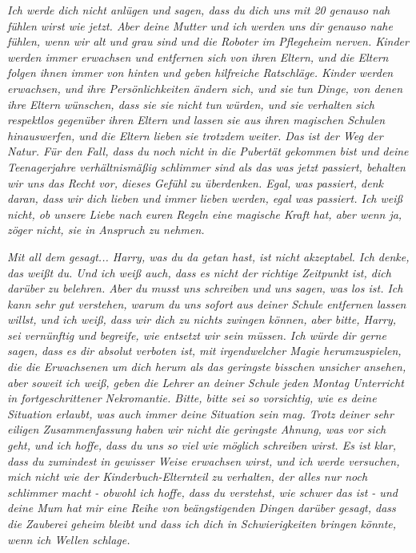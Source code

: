 {\emph{Ich werde dich nicht anlügen und sagen, dass du dich uns mit 20 genauso nah fühlen wirst wie jetzt. Aber deine Mutter und ich werden uns dir genauso nahe fühlen, wenn wir alt und grau sind und die Roboter im Pflegeheim nerven. Kinder werden immer erwachsen und entfernen sich von ihren Eltern, und die Eltern folgen ihnen immer von hinten und geben hilfreiche Ratschläge. Kinder werden erwachsen, und ihre Persönlichkeiten ändern sich, und sie tun Dinge, von denen ihre Eltern wünschen, dass sie sie nicht tun würden, und sie verhalten sich respektlos gegenüber ihren Eltern und lassen sie aus ihren magischen Schulen hinauswerfen, und die Eltern lieben sie trotzdem weiter. Das ist der Weg der Natur. Für den Fall, dass du noch nicht in die Pubertät gekommen bist und deine Teenagerjahre verhältnismäßig schlimmer sind als das was jetzt passiert, behalten wir uns das Recht vor, dieses Gefühl zu überdenken. Egal, was passiert, denk daran, dass wir dich lieben und immer lieben werden, egal was passiert. Ich weiß nicht, ob unsere Liebe nach euren Regeln eine magische Kraft hat, aber wenn ja, zöger nicht, sie in Anspruch zu nehmen.}

\emph{Mit all dem gesagt... Harry, was du da getan hast, ist nicht akzeptabel. Ich denke, das weißt du. Und ich weiß auch, dass es nicht der richtige Zeitpunkt ist, dich darüber zu belehren. Aber du musst uns schreiben und uns sagen, was los ist. Ich kann sehr gut verstehen, warum du uns sofort aus deiner Schule entfernen lassen willst, und ich weiß, dass wir dich zu nichts zwingen können, aber bitte, Harry, sei vernünftig und begreife, wie entsetzt wir sein müssen. Ich würde dir gerne sagen, dass es dir absolut verboten ist, mit irgendwelcher Magie herumzuspielen, die die Erwachsenen um dich herum als das geringste bisschen unsicher ansehen, aber soweit ich weiß, geben die Lehrer an deiner Schule jeden Montag Unterricht in fortgeschrittener Nekromantie. Bitte, bitte sei so vorsichtig, wie es deine Situation erlaubt, was auch immer deine Situation sein mag. Trotz deiner sehr eiligen Zusammenfassung haben wir nicht die geringste Ahnung, was vor sich geht, und ich hoffe, dass du uns so viel wie möglich schreiben wirst. Es ist klar, dass du zumindest in gewisser Weise erwachsen wirst, und ich werde versuchen, mich nicht wie der Kinderbuch-Elternteil zu verhalten, der alles nur noch schlimmer macht - obwohl ich hoffe, dass du verstehst, wie schwer das ist - und deine Mum hat mir eine Reihe von beängstigenden Dingen darüber gesagt, dass die Zauberei geheim bleibt und dass ich dich in Schwierigkeiten bringen könnte, wenn ich Wellen schlage.}

}
